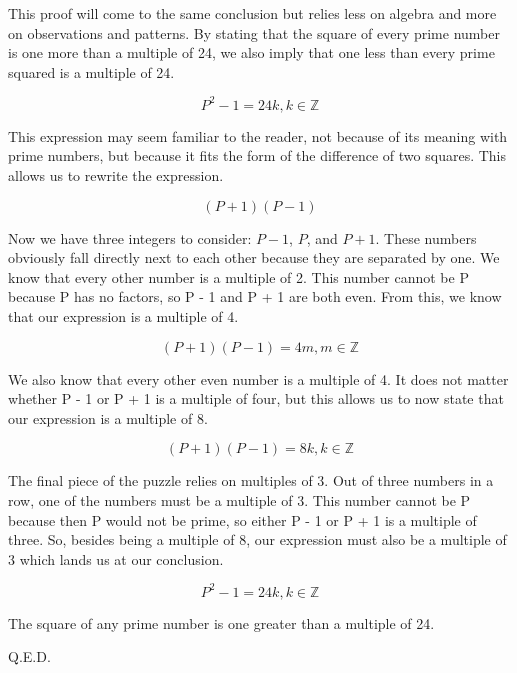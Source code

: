 This proof will come to the same conclusion but relies less on algebra and more on observations and patterns. By stating that the square of every prime number is one more than a multiple of 24, we also imply that one less than every prime squared is a multiple of 24.

\[P^2 - 1 = 24k, k \in \mathbb{Z}\]

This expression may seem familiar to the reader, not because of its meaning with prime numbers, but because it fits the form of the difference of two squares. This allows us to rewrite the expression.

\[(P + 1)(P - 1)\]

Now we have three integers to consider: \(P - 1\), \(P\), and \(P + 1\). These numbers obviously fall directly next to each other because they are separated by one. We know that every other number is a multiple of 2. This number cannot be P because P has no factors, so P - 1 and P + 1 are both even. From this, we know that our expression is a multiple of 4.

\[(P + 1)(P - 1) = 4m, m \in \mathbb{Z}\]

We also know that every other even number is a multiple of 4. It does not matter whether P - 1 or P + 1 is a multiple of four, but this allows us to now state that our expression is a multiple of 8. 

\[(P + 1)(P - 1) = 8k, k \in \mathbb{Z}\]

The final piece of the puzzle relies on multiples of 3. Out of three numbers in a row, one of the numbers must be a multiple of 3. This number cannot be P because then P would not be prime, so either P - 1 or P + 1 is a multiple of three. So, besides being a multiple of 8, our expression must also be a multiple of 3 which lands us at our conclusion.

\[P^2 - 1 = 24k, k \in \mathbb{Z}\]

The square of any prime number is one greater than a multiple of 24.

Q.E.D.
